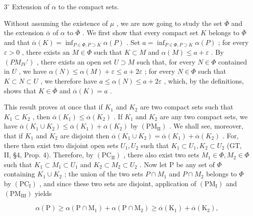 \(3^{\circ}\) Extension of \(\alpha\) to the compact sets.

Without assuming the existence of \(\mu\) , we are now going to study the set \(\overline{\Phi}\) and the extension \(\overline{\alpha}\) of \(\alpha\) to \(\overline{\Phi}\) . We first show that every compact set \(K\) belongs to \(\overline{\Phi}\) and that \(\overline{\alpha}(K) = \inf_{P \in \Phi, P \supset K} \alpha(P)\) . Set \(a = \inf_{P \in \Phi, P \supset K} \alpha(P)\) ; for every \(\varepsilon > 0\) , there exists an \(M \in \Phi\) such that \(K \subset M\) and \(\alpha(M) \leqslant a + \varepsilon\) . By \((PM_{IV}')\) , there exists an open set \(U \supset M\) such that, for every \(N \in \Phi\) contained in \(U\) , we have \(\alpha(N) \leqslant \alpha(M) + \varepsilon \leqslant a + 2\varepsilon\) ; for every \(N \in \Phi\) such that \(K \subset N \subset U\) , we therefore have \(a \leqslant \alpha(N) \leqslant a + 2\varepsilon\) , which, by the definitions, shows that \(K \in \overline{\Phi}\) and \(\overline{\alpha}(K) = a\) .

This result proves at once that if \(K_{1}\) and \(K_{2}\) are two compact sets such that \(K_{1} \subset K_{2}\) , then \(\overline{\alpha}(K_{1}) \leqslant \overline{\alpha}(K_{2})\) . If \(K_{1}\) and \(K_{2}\) are any two compact sets, we have \(\overline{\alpha}(K_{1} \cup K_{2}) \leqslant \overline{\alpha}(K_{1}) + \overline{\alpha}(K_{2})\) by \((\mathrm{PM}_{\mathrm{II}})\) . We shall see, moreover, that if \(K_{1}\) and \(K_{2}\) are disjoint then \(\overline{\alpha}(K_{1} \cup K_{2}) = \overline{\alpha}(K_{1}) + \overline{\alpha}(K_{2})\) . For, there then exist two disjoint open sets \(U_{1}, U_{2}\) such that \(K_{1} \subset U_{1}, K_{2} \subset U_{2}\) (GT, II, §4, Prop. 4). Therefore, by \((\mathrm{PC}_{\mathrm{II}})\) , there also exist two sets \(M_{1} \in \Phi, M_{2} \in \Phi\) such that \(K_{1} \subset M_{1} \subset U_{1}\) and \(K_{2} \subset M_{2} \subset U_{2}\) . Now let P be any set of \(\Phi\) containing \(K_{1} \cup K_{2}\) ; the union of the two sets \(P \cap M_{1}\) and \(P \cap M_{2}\) belongs to \(\Phi\) by \((\mathrm{PC}_{\mathrm{I}})\) , and since these two sets are disjoint, application of \((\mathrm{PM}_{\mathrm{I}})\) and \((\mathrm{PM}_{\mathrm{III}})\) yields

\[
\alpha (\mathrm{P}) \geqslant \alpha (\mathrm{P} \cap \mathrm{M} _ {1}) + \alpha (\mathrm{P} \cap \mathrm{M} _ {2}) \geqslant \overline {{\alpha}} (\mathrm{K} _ {1}) + \overline {{\alpha}} (\mathrm{K} _ {2}),
\]

